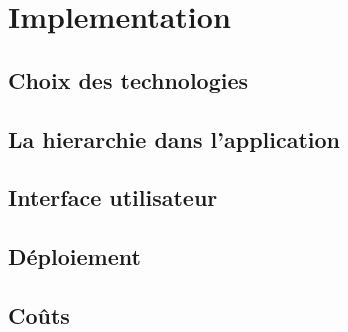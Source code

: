 \chapter{Implementation}
        \section{Choix des technologies}
        \lipsum[1]
        \section{La hierarchie dans l'application}
        \lipsum[1]
        \section{Interface utilisateur}
        \lipsum[1]
        \section{Déploiement}
        \lipsum[1]
        \section{Coûts}
        \lipsum[1]
    